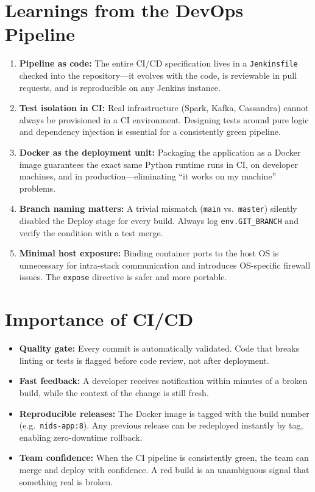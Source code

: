 \documentclass[12pt,a4paper]{report}
\begin{document}
\section{Learnings from the DevOps Pipeline}
\begin{enumerate}
  \item \textbf{Pipeline as code:}  The entire CI/CD specification lives in a
        \texttt{Jenkinsfile} checked into the repository---it evolves with the
        code, is reviewable in pull requests, and is reproducible on any
        Jenkins instance.
  \item \textbf{Test isolation in CI:}  Real infrastructure (Spark, Kafka,
        Cassandra) cannot always be provisioned in a CI environment.
        Designing tests around pure logic and dependency injection is essential
        for a consistently green pipeline.
  \item \textbf{Docker as the deployment unit:}  Packaging the application
        as a Docker image guarantees the exact same Python runtime runs in CI,
        on developer machines, and in production---eliminating ``it works on
        my machine'' problems.
  \item \textbf{Branch naming matters:}  A trivial mismatch (\texttt{main}
        vs.\ \texttt{master}) silently disabled the Deploy stage for every
        build.  Always log \texttt{env.GIT\_BRANCH} and verify the condition
        with a test merge.
  \item \textbf{Minimal host exposure:}  Binding container ports to the host
        OS is unnecessary for intra-stack communication and introduces
        OS-specific firewall issues.  The \texttt{expose} directive is safer
        and more portable.
\end{enumerate}

\section{Importance of CI/CD}
\begin{itemize}
  \item \textbf{Quality gate:}  Every commit is automatically validated.
        Code that breaks linting or tests is flagged before code review, not
        after deployment.
  \item \textbf{Fast feedback:}  A developer receives notification within
        minutes of a broken build, while the context of the change is still
        fresh.
  \item \textbf{Reproducible releases:}  The Docker image is tagged with the
        build number (e.g.\ \texttt{nids-app:8}).  Any previous release can
        be redeployed instantly by tag, enabling zero-downtime rollback.
  \item \textbf{Team confidence:}  When the CI pipeline is consistently
        green, the team can merge and deploy with confidence.  A red build is
        an unambiguous signal that something real is broken.
\end{itemize}
\end{document}
